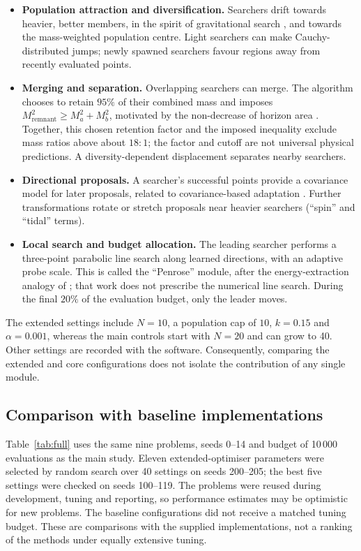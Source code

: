 \documentclass[10pt,a4paper]{article}
\begin{document}
\begin{itemize}
  \item \textbf{Population attraction and diversification.} Searchers drift
        towards heavier, better members, in the spirit of gravitational search
        \citep{rashedi2009}, and towards the mass-weighted population centre.
        Light searchers can make Cauchy-distributed jumps; newly spawned
        searchers favour regions away from recently evaluated points.
  \item \textbf{Merging and separation.} Overlapping searchers can merge.
        The algorithm chooses to retain $95\%$ of their combined mass and imposes
        $M_{\mathrm{remnant}}^2\ge M_a^2+M_b^2$, motivated by the non-decrease of
        horizon area \citep{hawking1971}. Together, this chosen retention factor
        and the imposed inequality exclude mass ratios above about $18{:}1$;
        the factor and cutoff are not universal physical predictions.
        A diversity-dependent displacement separates nearby searchers.
  \item \textbf{Directional proposals.} A searcher's successful points provide
        a covariance model for later proposals, related to covariance-based
        adaptation \citep{hansen2001}. Further transformations rotate or stretch
        proposals near heavier searchers (``spin'' and ``tidal'' terms).
  \item \textbf{Local search and budget allocation.} The leading searcher
        performs a three-point parabolic line search along learned directions,
        with an adaptive probe scale. This is called the ``Penrose'' module,
        after the energy-extraction analogy of \citet{penrose1969}; that work
        does not prescribe the numerical line search. During the final $20\%$ of the
        evaluation budget, only the leader moves.
\end{itemize}

The extended settings include $N=10$, a population cap of $10$, $k=0.15$ and
$\alpha=0.001$, whereas the main controls start with $N=20$ and can grow to 40.
Other settings are recorded with the software. Consequently, comparing the
extended and core configurations does not isolate the contribution of any
single module.

\subsection{Comparison with baseline implementations}

Table~\ref{tab:full} uses the same nine problems, seeds 0--14 and budget of
10\,000 evaluations as the main study. Eleven extended-optimiser parameters
were selected by random search over 40 settings on seeds 200--205; the best
five settings were checked on seeds 100--119. The problems were reused during
development, tuning and reporting, so performance estimates may be optimistic
for new problems. The baseline configurations did not receive a matched tuning
budget. These are comparisons with the supplied implementations, not a ranking
of the methods under equally extensive tuning.
\end{document}
